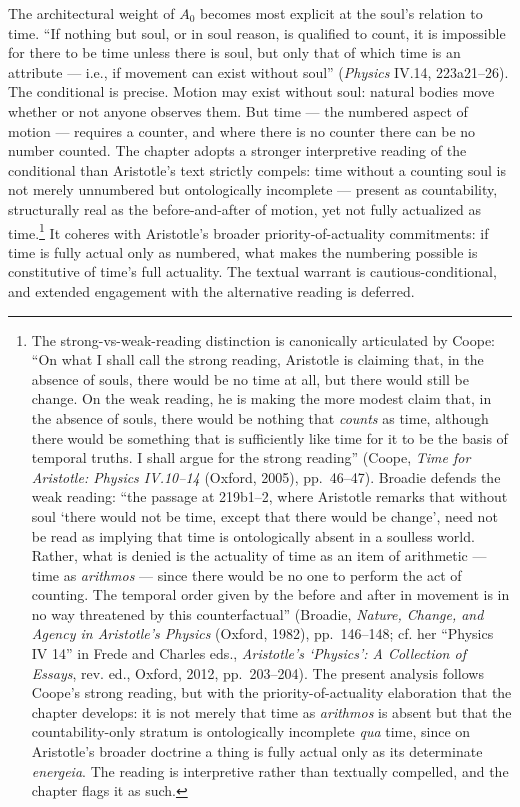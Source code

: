 The architectural weight of $A_0$ becomes most explicit at the soul's relation to time. ``If nothing but soul, or in soul reason, is qualified to count, it is impossible for there to be time unless there is soul, but only that of which time is an attribute --- i.e., if movement can exist without soul'' (\textit{Physics} IV.14, 223a21--26). The conditional is precise. Motion may exist without soul: natural bodies move whether or not anyone observes them. But time --- the numbered aspect of motion --- requires a counter, and where there is no counter there can be no number counted. The chapter adopts a stronger interpretive reading of the conditional than Aristotle's text strictly compels: time without a counting soul is not merely unnumbered but ontologically incomplete --- present as countability, structurally real as the before-and-after of motion, yet not fully actualized as time.\footnote{The strong-vs-weak-reading distinction is canonically articulated by Coope: ``On what I shall call the strong reading, Aristotle is claiming that, in the absence of souls, there would be no time at all, but there would still be change. On the weak reading, he is making the more modest claim that, in the absence of souls, there would be nothing that \textit{counts} as time, although there would be something that is sufficiently like time for it to be the basis of temporal truths. I shall argue for the strong reading'' (Coope, \textit{Time for Aristotle: Physics IV.10--14} (Oxford, 2005), pp.~46--47). Broadie defends the weak reading: ``the passage at 219b1--2, where Aristotle remarks that without soul `there would not be time, except that there would be change', need not be read as implying that time is ontologically absent in a soulless world. Rather, what is denied is the actuality of time as an item of arithmetic --- time as \textit{arithmos} --- since there would be no one to perform the act of counting. The temporal order given by the before and after in movement is in no way threatened by this counterfactual'' (Broadie, \textit{Nature, Change, and Agency in Aristotle's Physics} (Oxford, 1982), pp.~146--148; cf. her ``Physics IV 14'' in Frede and Charles eds., \textit{Aristotle's `Physics': A Collection of Essays}, rev. ed., Oxford, 2012, pp.~203--204). The present analysis follows Coope's strong reading, but with the priority-of-actuality elaboration that the chapter develops: it is not merely that time as \textit{arithmos} is absent but that the countability-only stratum is ontologically incomplete \textit{qua} time, since on Aristotle's broader doctrine a thing is fully actual only as its determinate \textit{energeia}. The reading is interpretive rather than textually compelled, and the chapter flags it as such.} It coheres with Aristotle's broader priority-of-actuality commitments: if time is fully actual only as numbered, what makes the numbering possible is constitutive of time's full actuality. The textual warrant is cautious-conditional, and extended engagement with the alternative reading is deferred.

